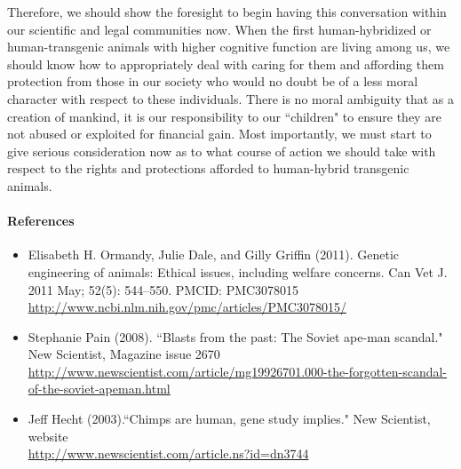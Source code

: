 \documentclass[letterpaper,10pt,twoside]{article}
\begin{document}
Therefore, we should show the foresight to begin having this conversation within our scientific and legal communities now. When the first human-hybridized or human-transgenic animals with higher cognitive function are living among us, we should know how to appropriately deal with caring for them and affording them protection from those in our society who would no doubt be of a less moral character with respect to these individuals.  There is no moral ambiguity that as a creation of mankind, it is our responsibility to our ``children" to ensure they are not abused or exploited for financial gain.  Most importantly, we must start to give serious consideration now as to what course of action we should take with respect to the rights and protections afforded to human-hybrid transgenic animals.
\paragraph{References}
\begin{itemize}
\item Elisabeth H. Ormandy, Julie Dale, and Gilly Griffin (2011). Genetic engineering of animals: Ethical issues, including welfare concerns. Can Vet J. 2011 May; 52(5): 544–550. PMCID: PMC3078015 \url{http://www.ncbi.nlm.nih.gov/pmc/articles/PMC3078015/}
\item Stephanie Pain (2008).  ``Blasts from the past: The Soviet ape-man scandal." New Scientist, Magazine issue 2670\\ \url{http://www.newscientist.com/article/mg19926701.000-the-forgotten-scandal-of-the-soviet-apeman.html}
\item Jeff Hecht (2003).``Chimps are human, gene study implies." New Scientist, website\\ \url{http://www.newscientist.com/article.ns?id=dn3744}
\end{itemize}
\end{document}

